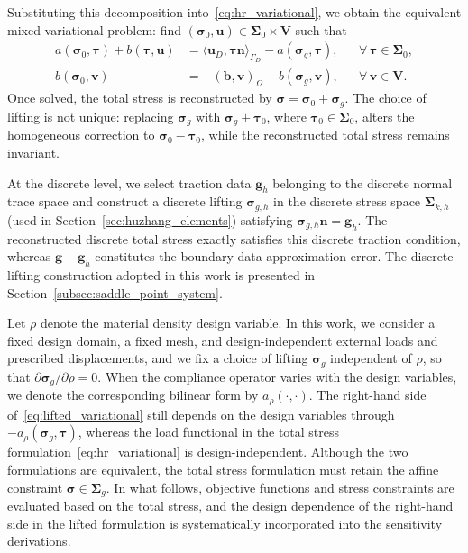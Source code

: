 Substituting this decomposition into~\eqref{eq:hr_variational}, we obtain the equivalent mixed variational problem: find $(\boldsymbol{\sigma}_0,\boldsymbol{u}) \in \boldsymbol{\Sigma}_0 \times \boldsymbol{V}$ such that
\begin{equation}
\label{eq:lifted_variational}
\begin{aligned}
a(\boldsymbol{\sigma}_0,\boldsymbol{\tau}) + b(\boldsymbol{\tau},\boldsymbol{u}) &= \langle \boldsymbol{u}_D, \boldsymbol{\tau}\boldsymbol{n} \rangle_{\Gamma_D} - a(\boldsymbol{\sigma}_g,\boldsymbol{\tau}), && \forall\,\boldsymbol{\tau}\in\boldsymbol{\Sigma}_0, \\
b(\boldsymbol{\sigma}_0,\boldsymbol{v}) &= -(\boldsymbol{b},\boldsymbol{v})_\Omega - b(\boldsymbol{\sigma}_g,\boldsymbol{v}), && \forall\,\boldsymbol{v}\in\boldsymbol{V}.
\end{aligned}
\end{equation}
Once solved, the total stress is reconstructed by $\boldsymbol{\sigma} = \boldsymbol{\sigma}_0 + \boldsymbol{\sigma}_g$. The choice of lifting is not unique: replacing $\boldsymbol{\sigma}_g$ with $\boldsymbol{\sigma}_g + \boldsymbol{\tau}_0$, where $\boldsymbol{\tau}_0 \in \boldsymbol{\Sigma}_0$, alters the homogeneous correction to $\boldsymbol{\sigma}_0 - \boldsymbol{\tau}_0$, while the reconstructed total stress remains invariant.

At the discrete level, we select traction data $\boldsymbol{g}_h$ belonging to the discrete normal trace space and construct a discrete lifting $\boldsymbol{\sigma}_{g,h}$ in the discrete stress space $\boldsymbol{\Sigma}_{k,h}$ (used in Section~\ref{sec:huzhang_elements}) satisfying $\boldsymbol{\sigma}_{g,h}\boldsymbol{n} = \boldsymbol{g}_h$. The reconstructed discrete total stress exactly satisfies this discrete traction condition, whereas $\boldsymbol{g} - \boldsymbol{g}_h$ constitutes the boundary data approximation error. The discrete lifting construction adopted in this work is presented in Section~\ref{subsec:saddle_point_system}.

Let $\rho$ denote the material density design variable. In this work, we consider a fixed design domain, a fixed mesh, and design-independent external loads and prescribed displacements, and we fix a choice of lifting $\boldsymbol{\sigma}_g$ independent of $\rho$, so that $\partial\boldsymbol{\sigma}_g/\partial\rho = 0$. When the compliance operator varies with the design variables, we denote the corresponding bilinear form by $a_\rho(\cdot,\cdot)$. The right-hand side of~\eqref{eq:lifted_variational} still depends on the design variables through $-a_\rho(\boldsymbol{\sigma}_g,\boldsymbol{\tau})$, whereas the load functional in the total stress formulation~\eqref{eq:hr_variational} is design-independent. Although the two formulations are equivalent, the total stress formulation must retain the affine constraint $\boldsymbol{\sigma} \in \boldsymbol{\Sigma}_g$. In what follows, objective functions and stress constraints are evaluated based on the total stress, and the design dependence of the right-hand side in the lifted formulation is systematically incorporated into the sensitivity derivations.
